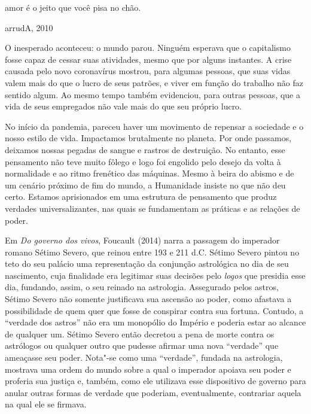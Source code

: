 
\epigraph{amor é o jeito que você pisa no chão.}{arrudA, 2010}

O inesperado aconteceu: o mundo parou. Ninguém esperava que o
capitalismo fosse capaz de cessar suas atividades, mesmo que por alguns
instantes. A crise causada pelo novo coronavírus mostrou, para algumas
pessoas, que suas vidas valem mais do que o lucro de seus patrões, e
viver em função do trabalho não faz sentido algum. Ao mesmo tempo também
evidenciou, para outras pessoas, que a vida de seus empregados não vale
mais do que seu próprio lucro.

No início da pandemia, pareceu haver um movimento de repensar a
sociedade e o nosso estilo de vida. Impactamos brutalmente no planeta.
Por onde passamos, deixamos nossas pegadas de sangue e rastros de
destruição. No entanto, esse pensamento não teve muito fôlego e logo foi
engolido pelo desejo da volta à normalidade e ao ritmo frenético das
máquinas. Mesmo à beira do abismo e de um cenário próximo de fim do
mundo, a Humanidade insiste no que não deu certo. Estamos aprisionados
em uma estrutura de pensamento que produz verdades universalizantes, nas
quais se fundamentam as práticas e as relações de poder.

Em \emph{Do governo dos vivos}, Foucault (2014) narra a passagem do
imperador romano Sétimo Severo, que reinou entre 193 e 211 d.C. Sétimo
Severo pintou no teto do seu palácio uma representação da conjunção
astrológica no dia de seu nascimento, cuja finalidade era legitimar suas
decisões pelo \emph{logos} que presidia esse dia, fundando, assim, o seu
reinado na astrologia. Assegurado pelos astros, Sétimo Severo não
somente justificava sua ascensão ao poder, como afastava a possibilidade
de quem quer que fosse de conspirar contra sua fortuna. Contudo, a
``verdade dos astros'' não era um monopólio do Império e poderia estar
ao alcance de qualquer um. Sétimo Severo então decretou a pena de morte
contra os astrólogos ou qualquer outro que pudesse afirmar uma nova
``verdade'' que ameaçasse seu poder. Nota"-se como uma ``verdade'',
fundada na astrologia, mostrava uma ordem do mundo sobre a qual o
imperador apoiava seu poder e proferia sua justiça e, também, como ele
utilizava esse dispositivo de governo para anular outras formas de
verdade que poderiam, eventualmente, contrariar aquela na qual ele se
firmava.

